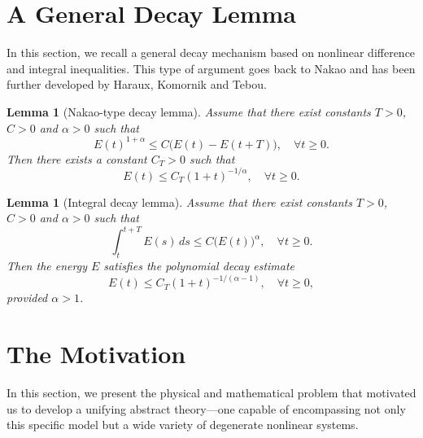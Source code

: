 \documentclass[11pt,reqno]{amsart}
\newtheorem{lemma}[theorem]{Lemma}
\theoremstyle{remark}
\begin{document}
\section{A General Decay Lemma}

In this section, we recall a general decay mechanism based on nonlinear
difference and integral inequalities. This type of argument goes back to Nakao and has been further developed by Haraux, Komornik and Tebou.

\begin{lemma}[Nakao-type decay lemma]\label{lem:nakao}
Assume that there exist constants $T>0$, $C>0$ and $\alpha>0$ such that
\begin{equation}\label{eq:difference_inequality}
E(t)^{1+\alpha} \le C \big( E(t) - E(t+T) \big),
\quad \forall t \ge 0.
\end{equation}
Then there exists a constant $C_T>0$ such that
\begin{equation}\label{eq:polynomial_decay_nakao}
E(t) \le C_T (1+t)^{-1/\alpha},
\quad \forall t \ge 0.
\end{equation}
\end{lemma}

\begin{lemma}[Integral decay lemma]\label{lem:integral_decay}
Assume that there exist constants $T>0$, $C>0$ and $\alpha>0$ such that
\begin{equation}\label{eq:integral_inequality}
\int_t^{t+T} E(s)\, ds \le C \big( E(t) \big)^{\alpha},
\quad \forall t \ge 0.
\end{equation}
Then the energy $E$ satisfies the polynomial decay estimate
\[
E(t) \le C_T (1+t)^{-1/(\alpha-1)},
\quad \forall t \ge 0,
\]
provided $\alpha>1$.
\end{lemma}

\section{The Motivation}
\label{sec:motivation}

In this section, we present the physical and mathematical problem that motivated us to develop a unifying abstract theory—one capable of encompassing not only this specific model but a wide variety of degenerate nonlinear systems.
\end{document}
